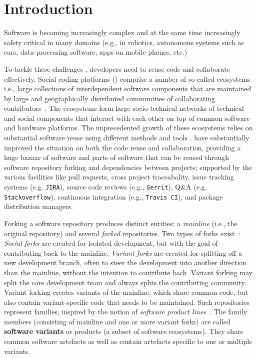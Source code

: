 \section{Introduction}
Software is becoming increasingly complex and at the same time increasingly safety critical in many domains (e.g., in robotics, autonomous systems such as cars, data-processing software, apps on mobile phones, etc.)

To tackle these challenges , developers need to reuse code and collaborate effectively.
Social coding platforms (\scp) comprise a number of so-called ecosystems i.e., large collections of interdependent software components that are maintained by large and geographically distributed communities of collaborating contributors~\cite{lungu:2008,decan:2017}.
The ecosystems form large socio-technical networks of technical and social components that interact with each other on top of common software and hardware platforms.
The unprecedented growth of these ecosystems relies on substantial software reuse using different methods and tools \cite{mojica2014large}.
\scp have substantially improved the situation on both the code reuse and collaboration, providing a huge bazaar of software and parts of software that can be reused through software repository forking and dependencies between projects; supported by the various facilities like pull requests, cross project traceabality, issue tracking systems (e.g. \texttt{JIRA}), source code reviews (e.g., \texttt{Gerrit}), Q\&A (e.g. \texttt{Stackoverflow}), continuous integration (e.g., \texttt{Travis CI}), and package distribution managers.




Forking a software repository produces distinct entities: a \textit{mainline} (i.e., the original repository) and several \textit{forked} repositories.
Two types of forks exist~\cite{Zhou:2020}: \textit{Social forks} are created for isolated development, but with the goal of contributing back to the mainline.
\textit{Variant forks} are created for splitting off a new development branch, often to steer the development into another direction than the mainline, without the intention to contribute back.
Variant forking may split the core development team and always splits the contributing community.
Variant forking creates variants of the mainline, which share common code, but also contain variant-specific code that needs to be maintained.
Such repositories represent families, inspired by the notion of \textit{software product lines}~\cite{berger.ea:2020:emse}.
The family members (consisting of mainline and one or more variant forks) are called \textbf{software variants} or products (a subset of software ecosystems).
They share common software artefacts as well as contain artefacts specific to one or multiple variants.

